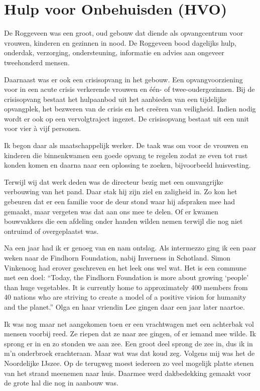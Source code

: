 \documentclass[12pt,twoside]{memoir}
\begin{document}
\chapter{Hulp voor Onbehuisden (HVO)} %
\label{cha:hvo}

De Roggeveen was een groot, oud gebouw dat diende als opvangcentrum voor vrouwen, kinderen en gezinnen in nood. De Roggeveen bood dagelijks hulp, onderdak, verzorging, ondersteuning, informatie en advies aan ongeveer tweehonderd mensen.

Daarnaast was er ook een crisisopvang in het gebouw. Een opvangvoorziening voor in een acute crisis verkerende vrouwen en één- of twee-oudergezinnen. Bij de crisisopvang bestaat het hulpaanbod uit het aanbieden van een tijdelijke opvangplek, het bezweren van de crisis en het creëren van veiligheid. Indien nodig wordt er ook op een vervolgtraject ingezet. De crisisopvang bestaat uit een unit voor vier à vijf personen.

Ik begon daar als maatschappelijk werker. De taak was om voor de vrouwen en kinderen die binnenkwamen een goede opvang te regelen zodat ze even tot rust konden komen en daarna naar een oplossing te zoeken, bijvoorbeeld huisvesting. 

Terwijl wij dat werk deden was de directeur bezig met een omvangrijke verbouwing van het pand. Daar stak hij zijn ziel en zaligheid in. Zo kon het gebeuren dat er een familie voor de deur stond waar hij afspraken mee had gemaakt, maar vergeten was dat aan ons mee te delen. Of er kwamen bouwvakkers die een afdeling onder handen wilden nemen terwijl die nog niet ontruimd of overgeplaatst was. 

Na een jaar had ik er genoeg van en nam ontslag. Als intermezzo ging ik een paar weken naar de Findhorn Foundation, nabij Inverness in Schotland. Simon Vinkenoog had erover geschreven en het leek ons wel wat. Het is een commune met een doel: ``Today, the Findhorn Foundation is more about growing `people' than huge vegetables. It is currently home to approximately 400 members from 40 nations who are striving to create a model of a positive vision for humanity and the planet.'' Olga en haar vriendin Lee gingen daar een jaar later naartoe.

Ik was nog maar net aangekomen toen er een vrachtwagen met een achterbak vol mensen voorbij reed. Ze riepen dat ze naar zee gingen, of er iemand mee wilde. Ik sprong er in en zo stonden we aan zee. Een groot deel sprong de zee in, dus ik in m’n onderbroek erachteraan. Maar wat was dat koud zeg. Volgens mij was het de Noordelijke IJszee. Op de terugweg moest iedereen zo veel mogelijk platte stenen van het strand meenemen naar huis. Daarmee werd dakbedekking gemaakt voor de grote hal die nog in aanbouw was. 
\end{document}

